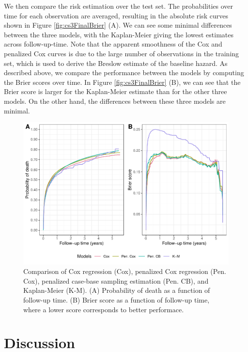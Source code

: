 We then compare the risk estimation over the test set. The probabilities
over time for each observation are averaged, resulting in the absolute
risk curves shown in Figure \ref{fig:cs3FinalBrier} (A). We can see some
minimal differences between the three models, with the Kaplan-Meier
giving the lowest estimates across follow-up-time. Note that the
apparent smoothness of the Cox and penalized Cox curves is due to the
large number of observations in the training set, which is used to
derive the Breslow estimate of the baseline hazard. As described above,
we compare the performance between the models by computing the Brier
scores over time. In Figure \ref{fig:cs3FinalBrier} (B), we can see that
the Brier score is larger for the Kaplan-Meier estimate than for the
other three models. On the other hand, the differences between these
three models are minimal.

\begin{Schunk}
\begin{figure}[ht]
\includegraphics[width=\textwidth,keepaspectratio=true]{./riskregressionBrier-1} \caption{\label{fig:cs3FinalBrier} Comparison of Cox regression (Cox), penalized Cox regression (Pen. Cox), penalized case-base sampling estimation (Pen. CB), and Kaplan-Meier (K-M). (A)  Probability of death as a function of follow-up time. (B) Brier score as a function of follow-up time, where a lower score corresponds to better performace.}\label{fig:riskregressionBrier}
\end{figure}
\end{Schunk}

\hypertarget{discussion}{%
\section{Discussion}\label{discussion}}


